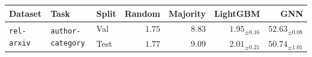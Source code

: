\begin{tabular}{lllrrrr}
\toprule
Dataset & Task & Split & Random & Majority & LightGBM & GNN \\
\midrule
\multirow[c]{2}{*}{\texttt{rel-arxiv}} & \multirow[c]{2}{*}{\texttt{author-category}} & Val & $1.75$ & $8.83$ & $1.95_{\pm 0.16}$ & $\bm{52.63}_{\pm 0.08}$ \\
 &  & Test & $1.77$ & $9.09$ & $2.01_{\pm 0.21}$ & $\bm{50.74}_{\pm 1.01}$ \\
\bottomrule
\end{tabular}
